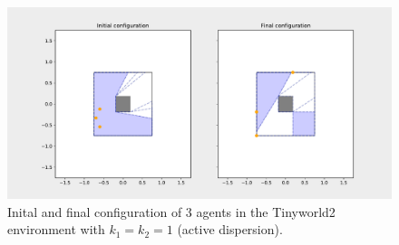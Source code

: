 \begin{figure}[H]
  \centering
  \includegraphics[width=\textwidth]{figs/tinyworld2_3_agnt_k_1_1_k_2_1_distr.pdf}
  \caption{Inital and final configuration of 3 agents in the Tinyworld2 environment with $k_{1} = k_{2} = 1$ (active dispersion).}
  \label{fig:3_agnt_tw2_k_1_1_k_2_1_distr}
\end{figure}
